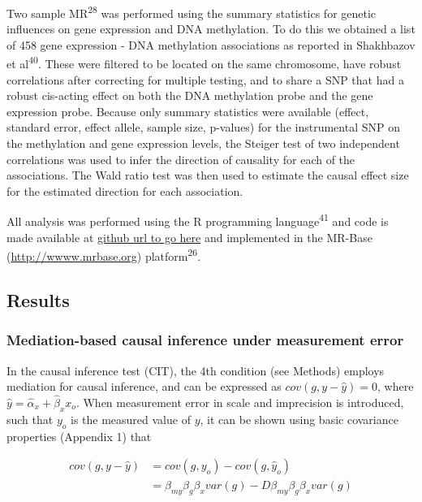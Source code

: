 \documentclass[]{article}
\begin{document}
Two sample MR\textsuperscript{28} was performed using the summary
statistics for genetic influences on gene expression and DNA
methylation. To do this we obtained a list of 458 gene expression - DNA
methylation associations as reported in Shakhbazov et
al\textsuperscript{40}. These were filtered to be located on the same
chromosome, have robust correlations after correcting for multiple
testing, and to share a SNP that had a robust cis-acting effect on both
the DNA methylation probe and the gene expression probe. Because only
summary statistics were available (effect, standard error, effect
allele, sample size, p-values) for the instrumental SNP on the
methylation and gene expression levels, the Steiger test of two
independent correlations was used to infer the direction of causality
for each of the associations. The Wald ratio test was then used to
estimate the causal effect size for the estimated direction for each
association.

All analysis was performed using the R programming
language\textsuperscript{41} and code is made available at
\href{}{github url to go here} and implemented in the MR-Base
(\url{http://wwww.mrbase.org}) platform\textsuperscript{26}.

\subsection{Results}\label{results}

\subsubsection{Mediation-based causal inference under measurement
error}\label{mediation-based-causal-inference-under-measurement-error}

In the causal inference test (CIT), the 4th condition (see Methods)
employs mediation for causal inference, and can be expressed as
\(cov(g, y - \hat{y}) = 0\), where
\(\hat{y} = \hat{\alpha}_x + \hat{\beta}_x x_o\). When measurement error
in scale and imprecision is introduced, such that \(y_o\) is the
measured value of \(y\), it can be shown using basic covariance
properties (Appendix 1) that

\[
\begin{aligned}
cov(g, y - \hat{y}) & = cov(g, y_o) - cov(g, \hat{y}_o)  \\
                    & = \beta_{my} \beta_g \beta_x var(g) - D \beta_{my} \beta_g \beta_x var(g)
\end{aligned}
\]
\end{document}
